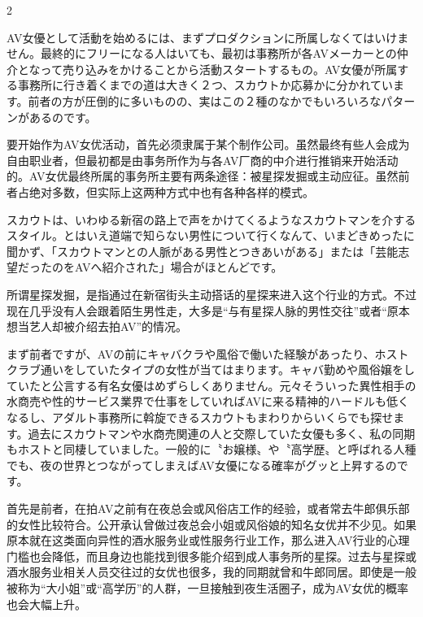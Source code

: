 \documentclass[12pt,UTF8]{ctexbook}
\begin{document}
\begin{paracol}{2}

AV女優として活動を始めるには、まずプロダクションに所属しなくてはいけません。最終的にフリーになる人はいても、最初は事務所が各AVメーカーとの仲介となって売り込みをかけることから活動スタートするもの。AV女優が所属する事務所に行き着くまでの道は大きく２つ、スカウトか応募かに分かれています。前者の方が圧倒的に多いものの、実はこの２種のなかでもいろいろなパターンがあるのです。

\switchcolumn

要开始作为AV女优活动，首先必须隶属于某个制作公司。虽然最终有些人会成为自由职业者，但最初都是由事务所作为与各AV厂商的中介进行推销来开始活动的。AV女优最终所属的事务所主要有两条途径：被星探发掘或主动应征。虽然前者占绝对多数，但实际上这两种方式中也有各种各样的模式。

\switchcolumn*

スカウトは、いわゆる新宿の路上で声をかけてくるようなスカウトマンを介するスタイル。とはいえ道端で知らない男性について行くなんて、いまどきめったに聞かず、「スカウトマンとの人脈がある男性とつきあいがある」または「芸能志望だったのをAVへ紹介された」場合がほとんどです。

\switchcolumn

所谓星探发掘，是指通过在新宿街头主动搭话的星探来进入这个行业的方式。不过现在几乎没有人会跟着陌生男性走，大多是“与有星探人脉的男性交往”或者“原本想当艺人却被介绍去拍AV”的情况。

\switchcolumn*

まず前者ですが、AVの前にキャバクラや風俗で働いた経験があったり、ホストクラブ通いをしていたタイプの女性が当てはまります。キャバ勤めや風俗嬢をしていたと公言する有名女優はめずらしくありません。元々そういった異性相手の水商売や性的サービス業界で仕事をしていればAVに来る精神的ハードルも低くなるし、アダルト事務所に斡旋できるスカウトもまわりからいくらでも探せます。過去にスカウトマンや水商売関連の人と交際していた女優も多く、私の同期もホストと同棲していました。一般的に〝お嬢様〟や〝高学歴〟と呼ばれる人種でも、夜の世界とつながってしまえばAV女優になる確率がグッと上昇するのです。

\switchcolumn

首先是前者，在拍AV之前有在夜总会或风俗店工作的经验，或者常去牛郎俱乐部的女性比较符合。公开承认曾做过夜总会小姐或风俗娘的知名女优并不少见。如果原本就在这类面向异性的酒水服务业或性服务行业工作，那么进入AV行业的心理门槛也会降低，而且身边也能找到很多能介绍到成人事务所的星探。过去与星探或酒水服务业相关人员交往过的女优也很多，我的同期就曾和牛郎同居。即使是一般被称为“大小姐”或“高学历”的人群，一旦接触到夜生活圈子，成为AV女优的概率也会大幅上升。


\end{paracol}
\end{document}
